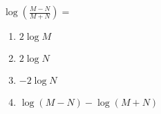 \bigskip

\item $\log \left( \frac{M-N}{M+N} \right) = $

\begin{enumerate}
\item $2 \log M$
\item $2 \log N$
\item $-2 \log N$
\item $\log(M-N) - \log(M+N)$
\end{enumerate}

